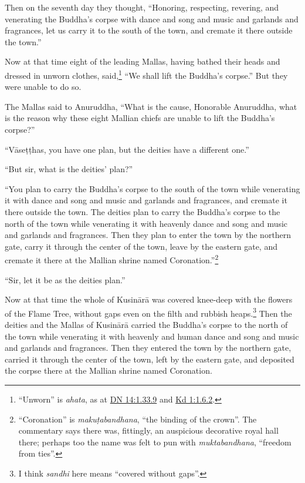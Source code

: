 \documentclass[12pt,openany]{book}%
\begin{document}
Then on the seventh day they thought, “Honoring, respecting, revering, and venerating the Buddha’s corpse with dance and song and music and garlands and fragrances, let us carry it to the south of the town, and cremate it there outside the town.” 

Now at that time eight of the leading Mallas, having bathed their heads and dressed in unworn clothes, said,\footnote{“Unworn” is \textit{ahata}, as at \href{https://suttacentral.net/dn14/en/sujato\#1.33.9}{DN 14:1.33.9} and \href{https://suttacentral.net/pli-tv-kd1/en/sujato\#1.6.2}{Kd 1:1.6.2}. } “We shall lift the Buddha’s corpse.” But they were unable to do so. 

The Mallas said to Anuruddha, “What is the cause, Honorable Anuruddha, what is the reason why these eight Mallian chiefs are unable to lift the Buddha’s corpse?” 

“\textsanskrit{Vāseṭṭhas}, you have one plan, but the deities have a different one.” 

“But sir, what is the deities’ plan?” 

“You plan to carry the Buddha’s corpse to the south of the town while venerating it with dance and song and music and garlands and fragrances, and cremate it there outside the town. The deities plan to carry the Buddha’s corpse to the north of the town while venerating it with heavenly dance and song and music and garlands and fragrances. Then they plan to enter the town by the northern gate, carry it through the center of the town, leave by the eastern gate, and cremate it there at the Mallian shrine named Coronation.”\footnote{“Coronation” is \textit{\textsanskrit{makuṭabandhana}}, “the binding of the crown”. The commentary says there was, fittingly, an auspicious decorative royal hall there; perhaps too the name was felt to pun with \textit{muktabandhana}, “freedom from ties”. } 

“Sir, let it be as the deities plan.” 

Now at that time the whole of \textsanskrit{Kusinārā} was covered knee-deep with the flowers of the Flame Tree, without gaps even on the filth and rubbish heaps.\footnote{I think \textit{sandhi} here means “covered without gaps”. } Then the deities and the Mallas of \textsanskrit{Kusinārā} carried the Buddha’s corpse to the north of the town while venerating it with heavenly and human dance and song and music and garlands and fragrances. Then they entered the town by the northern gate, carried it through the center of the town, left by the eastern gate, and deposited the corpse there at the Mallian shrine named Coronation. 
\end{document}

